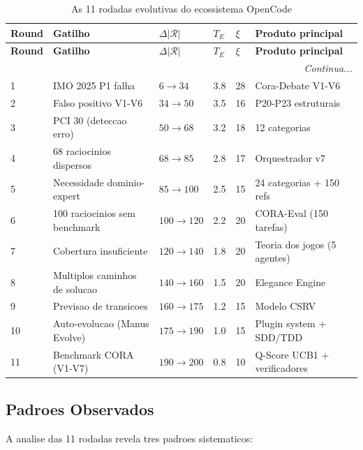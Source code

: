 \documentclass[5p]{elsarticle}
\begin{document}
\begin{longtable}{p{1.2cm}p{2.5cm}p{1.5cm}p{1cm}p{1.5cm}p{3cm}}
  \caption{As 11 rodadas evolutivas do ecossistema OpenCode}
  \label{tab:11rounds} \\
  \toprule
  \textbf{Round} & \textbf{Gatilho} & $\Delta|\mathcal{R}|$ & $T_E$ & $\xi$ & \textbf{Produto principal} \\
  \midrule
  \endfirsthead
  \toprule
  \textbf{Round} & \textbf{Gatilho} & $\Delta|\mathcal{R}|$ & $T_E$ & $\xi$ & \textbf{Produto principal} \\
  \midrule
  \endhead
  \midrule
  \multicolumn{6}{r}{\textit{Continua...}} \\
  \endfoot
  \bottomrule
  \endlastfoot

  1 & IMO 2025 P1 falha & $6 \to 34$ & 3.8 & 28 & Cora-Debate V1-V6 \\
  2 & Falso positivo V1-V6 & $34 \to 50$ & 3.5 & 16 & P20-P23 estruturais \\
  3 & PCI 30 (deteccao erro) & $50 \to 68$ & 3.2 & 18 & 12 categorias \\
  4 & 68 raciocinios dispersos & $68 \to 85$ & 2.8 & 17 & Orquestrador v7 \\
  5 & Necessidade dominio-expert & $85 \to 100$ & 2.5 & 15 & 24 categorias + 150 refs \\
  6 & 100 raciocinios sem benchmark & $100 \to 120$ & 2.2 & 20 & CORA-Eval (150 tarefas) \\
  7 & Cobertura insuficiente & $120 \to 140$ & 1.8 & 20 & Teoria dos jogos (5 agentes) \\
  8 & Multiplos caminhos de solucao & $140 \to 160$ & 1.5 & 20 & Elegance Engine \\
  9 & Previsao de transicoes & $160 \to 175$ & 1.2 & 15 & Modelo CSRV \\
  10 & Auto-evolucao (Manus Evolve) & $175 \to 190$ & 1.0 & 15 & Plugin system + SDD/TDD \\
  11 & Benchmark CORA (V1-V7) & $190 \to 200$ & 0.8 & 10 & Q-Score UCB1 + verificadores \\
\end{longtable}

\subsection{Padroes Observados}

A analise das 11 rodadas revela tres padroes sistematicos:
\end{document}
